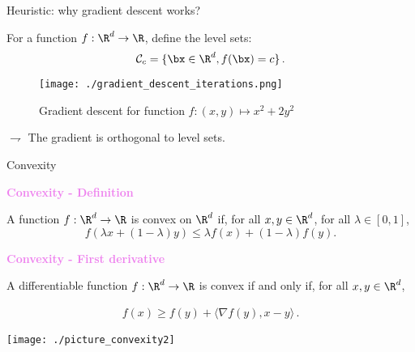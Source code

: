 \documentclass[xcolor={usenames,dvipsnames}]{beamer}
\begin{document}
\begin{frame}{Heuristic: why gradient descent works?}
	
For a function $f: \R^d \to \R$, define the \alert{level sets}: 
$$
\mathcal{C}_c = \{ \bx \in \R^d, f(\bx) = c\}\,.
$$
	
	
\begin{center}
\begin{figure}
\texttt{[image: ./gradient\_descent\_iterations.png]}
\caption{Gradient descent for function $f: (x,y) \mapsto x^2 + 2 y^2$}
\end{figure}
\end{center}
	
$\rightharpoondown$  The gradient is \alert{orthogonal to level sets}. 

\end{frame}



\begin{frame}{Convexity}

\textbf{\textcolor{violet}{Convexity - Definition}}

A function $f : \R^d \to \R$ is \alert{convex} on $\R^d$ if, for all $x, y \in \R^d$, for all $\lambda \in [0,1]$,
$$
f(\lambda x + (1- \lambda) y ) \leq \lambda f(x) + (1 - \lambda) f(y).
$$	

\textbf{\textcolor{violet}{Convexity - First derivative}}
		
A \alert{differentiable function $f : \R^d \to \R$} is convex if and only if, for all $x,y\in\R^d$,

\begin{align*}
f(x) \geqslant f(y) + \langle \nabla f (y), x-y \rangle\,. 
\end{align*}
	
\vspace{0.4cm}
	
\begin{center}
\texttt{[image: ./picture\_convexity2]}
\end{center}
\end{frame}
\end{document}
